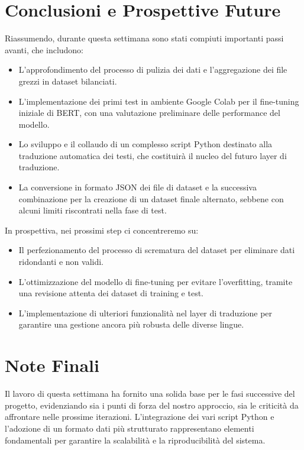 \documentclass[a4paper,12pt]{article}
\begin{document}
\section{Conclusioni e Prospettive Future}
Riassumendo, durante questa settimana sono stati compiuti importanti passi avanti, che includono:
\begin{itemize}
    \item L’approfondimento del processo di pulizia dei dati e l’aggregazione dei file grezzi in dataset bilanciati.
    \item L’implementazione dei primi test in ambiente Google Colab per il fine-tuning iniziale di BERT, con una valutazione preliminare delle performance del modello.
    \item Lo sviluppo e il collaudo di un complesso script Python destinato alla traduzione automatica dei testi, che costituirà il nucleo del futuro layer di traduzione.
    \item La conversione in formato JSON dei file di dataset e la successiva combinazione per la creazione di un dataset finale alternato, sebbene con alcuni limiti riscontrati nella fase di test.
\end{itemize}

In prospettiva, nei prossimi step ci concentreremo su:
\begin{itemize}
    \item Il perfezionamento del processo di scrematura del dataset per eliminare dati ridondanti e non validi.
    \item L'ottimizzazione del modello di fine-tuning per evitare l’overfitting, tramite una revisione attenta dei dataset di training e test.
    \item L'implementazione di ulteriori funzionalità nel layer di traduzione per garantire una gestione ancora più robusta delle diverse lingue.
\end{itemize}

\section*{Note Finali}
Il lavoro di questa settimana ha fornito una solida base per le fasi successive del progetto, evidenziando sia i punti di forza del nostro approccio, sia le criticità da affrontare nelle prossime iterazioni. L'integrazione dei vari script Python e l'adozione di un formato dati più strutturato rappresentano elementi fondamentali per garantire la scalabilità e la riproducibilità del sistema.
\end{document}
